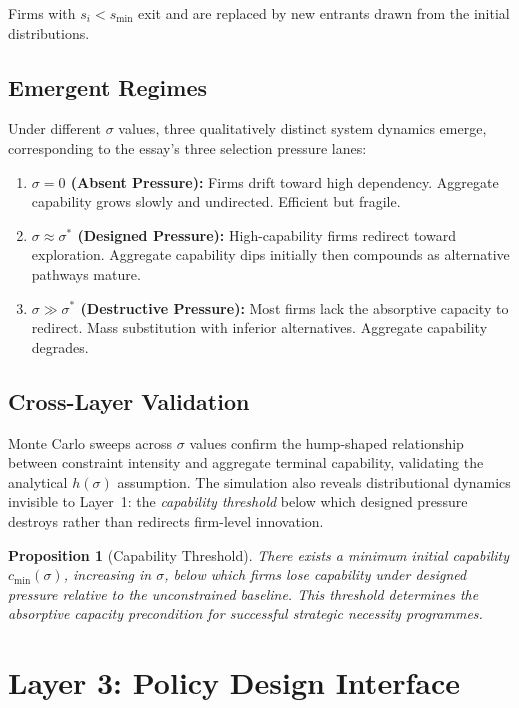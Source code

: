 \documentclass[11pt,a4paper]{article}
\newtheorem{proposition}{Proposition}
\theoremstyle{remark}
\begin{document}
Firms with $s_i < s_{\min}$ exit and are replaced by new entrants drawn from the initial distributions.

\subsection{Emergent Regimes}

Under different $\sigma$ values, three qualitatively distinct system dynamics emerge, corresponding to the essay's three selection pressure lanes:

\begin{enumerate}
    \item \textbf{$\sigma = 0$ (Absent Pressure):} Firms drift toward high dependency. Aggregate capability grows slowly and undirected. Efficient but fragile.
    \item \textbf{$\sigma \approx \sigma^*$ (Designed Pressure):} High-capability firms redirect toward exploration. Aggregate capability dips initially then compounds as alternative pathways mature.
    \item \textbf{$\sigma \gg \sigma^*$ (Destructive Pressure):} Most firms lack the absorptive capacity to redirect. Mass substitution with inferior alternatives. Aggregate capability degrades.
\end{enumerate}

\subsection{Cross-Layer Validation}

Monte Carlo sweeps across $\sigma$ values confirm the hump-shaped relationship between constraint intensity and aggregate terminal capability, validating the analytical $h(\sigma)$ assumption. The simulation also reveals distributional dynamics invisible to Layer~1: the \emph{capability threshold} below which designed pressure destroys rather than redirects firm-level innovation.

\begin{proposition}[Capability Threshold]
There exists a minimum initial capability $c_{\min}(\sigma)$, increasing in $\sigma$, below which firms lose capability under designed pressure relative to the unconstrained baseline. This threshold determines the absorptive capacity precondition for successful strategic necessity programmes.
\end{proposition}

\section{Layer 3: Policy Design Interface}
\end{document}
